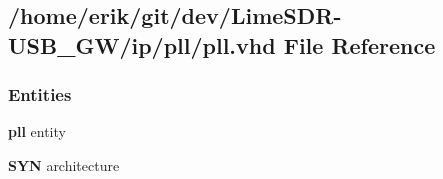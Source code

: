 \subsection{/home/erik/git/dev/\+Lime\+S\+D\+R-\/\+U\+S\+B\+\_\+\+G\+W/ip/pll/pll.vhd File Reference}
\label{pll_8vhd}
\subsubsection*{Entities}
\begin{DoxyCompactItemize}
\item 
{\bf pll} entity
\item 
{\bf S\+YN} architecture
\end{DoxyCompactItemize}
